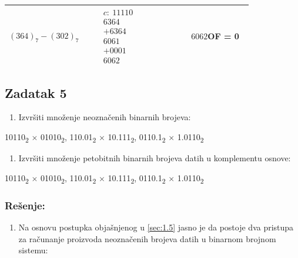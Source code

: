 \documentclass[a4paper,11pt]{article}
\numberwithin{equation}{section}
\newcommand{\redlinija}{\arrayrulecolor{black!28}\specialrule{0.3pt}{2pt}{2pt}\arrayrulecolor{black}}
\begin{document}
\begin{longtable}{p{0.34\linewidth} p{0.34\linewidth} p{0.23\linewidth}}
\redlinija
$(364)_{7}-(302)_{7}$ & $\begin{array}{r}c:\ 11110\\6364\\+6364\\\hline 6061\\+0001\\\hline 6062\end{array}$ & $6062$\newline OF = 0\\[5pt]
\bottomrule\end{longtable}


\FloatBarrier
\subsection{Zadatak 5}\label{sec:2.5}


\begin{enumerate}[label=\alph*),start=1,leftmargin=*]
\item Izvršiti množenje neoznačenih binarnih brojeva:

\end{enumerate}


10110\textsubscript{2} \ensuremath{\times} 01010\textsubscript{2}, 110.01\textsubscript{2} \ensuremath{\times} 10.111\textsubscript{2}, 0110.1\textsubscript{2} \ensuremath{\times} 1.0110\textsubscript{2}



\begin{enumerate}[label=\alph*),start=2,leftmargin=*]
\item Izvršiti množenje petobitnih binarnih brojeva datih u komplementu osnove:

\end{enumerate}


10110\textsubscript{2} \ensuremath{\times} 01010\textsubscript{2}, 110.01\textsubscript{2} \ensuremath{\times} 10.111\textsubscript{2}, 0110.1\textsubscript{2} \ensuremath{\times} 1.0110\textsubscript{2}



\subsubsection*{Rešenje:}


\begin{enumerate}[label=\alph*),start=1,leftmargin=*]
\item Na osnovu postupka objašnjenog u \ref{sec:1.5} jasno je da postoje dva pristupa za računanje proizvoda neoznačenih brojeva datih u binarnom brojnom sistemu:

\end{enumerate}
\end{document}
